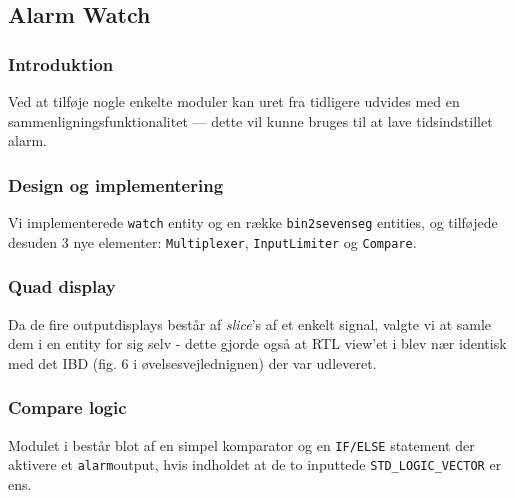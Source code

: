 {
    \newcommand{\labelprefix}{src6-4}

\subsection{Alarm Watch}

\subsubsection{Introduktion}

Ved at tilføje nogle enkelte moduler kan uret fra tidligere udvides med en sammenligningsfunktionalitet --- dette vil kunne bruges til at lave tidsindstillet alarm. 

\subsubsection{Design og implementering}

Vi implementerede \texttt{watch} entity og en række \texttt{bin2sevenseg} entities, og tilføjede desuden 3 nye elementer: \texttt{Multiplexer}, \texttt{InputLimiter} og \texttt{Compare}.


\subsubsection*{Quad display}

Da de fire outputdisplays består af \emph{slice}'s af et enkelt signal, valgte vi at samle dem i en entity for sig selv - dette gjorde også at RTL view'et i  blev nær identisk med det IBD (fig. 6 i øvelsesvejlednignen) der var udleveret. 

\subsubsection*{Compare logic}
Modulet i  består blot af en simpel komparator og en \texttt{IF/ELSE} statement der aktivere et \texttt{alarm}output, hvis indholdet at de to inputtede \texttt{STD\_LOGIC\_VECTOR} er ens.

}
